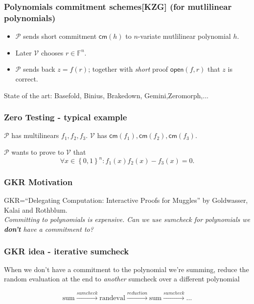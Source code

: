 \documentclass[shadesubsections,compress,14pt,mathserif]{beamer}
\newcommand{\F}{\ensuremath{{\mathbb F}}}
\newcommand{\set}[1]{\ensuremath{\left\{#1\right\}}}
\newcommand{\bin}{\ensuremath{\set{0,1}}}
\newcommand{\cube}{\ensuremath{\bin^n}}
\newcommand{\cm}{\ensuremath{\mathsf{cm}}}
\newcommand{\open}[1]{\ensuremath{\mathsf{open}(#1)}}
\newcommand{\ver}{\ensuremath{\mathcal{V}}}
\newcommand{\prv}{\ensuremath{\mathcal{P}}}
\newcommand{\nl}{\\ \pause \vspace{0.2in}}
\newcommand{\nlnp}{\\ \vspace{0.2in}}
\begin{document}
\begin{frame}
 \frametitle{Polynomials commitment schemes[KZG] (for mutlilinear polynomials)}
\begin{itemize}
 \item $\prv$ sends short commitment $\cm(h)$ to $n$-variate mutlilinear  polynomial $h$.\pause
 \item Later $\ver$  chooses  $r\in \F^n$.\pause
 \item $\prv$ sends back $z=f(r)$; together with \emph{short} proof $\open{f,r}$ that $z$ is correct.\pause
\end{itemize}
 State of the art: Basefold, Binius, Brakedown, Gemini,Zeromorph,...
\end{frame}

\begin{frame}
 \frametitle{ Zero Testing - typical example}
 $\prv$ has multilinears $f_1,f_2,f_3$. $\ver$ has $\cm(f_1),\cm(f_2),\cm(f_3)$.\nl
 
 $\prv$ wants to prove to $\ver$ that 
 \[\forall x\in\cube: f_1(x)f_2(x)-f_3(x) =0.\]
\end{frame}


\begin{frame}
\frametitle{GKR Motivation}   %
GKR=``Delegating Computation: Interactive Proofs for Muggles'' by Goldwasser, Kalai and Rothblum.\nl
\emph{Committing to polynomials is expensive. Can we use sumcheck for polynomials we \textbf{don't} have a commitment to?}

\end{frame}
\begin{frame}
 \frametitle{GKR idea - iterative sumcheck}
 When we don't have a commitment to the polynomial we're summing, reduce the random evaluation at the end
 to \emph{another} sumcheck over a different polynomial\nlnp
 
 \[\mathrm{sum}\stackrel{sumcheck}{\to}\mathrm{rand eval} \stackrel{reduction}{\to}\mathrm{sum}\stackrel{sumcheck}{\to}\ldots\]
\end{frame}
\end{document}
